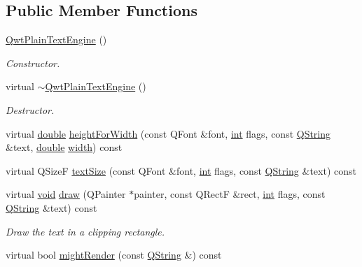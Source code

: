 \subsection*{Public Member Functions}
\begin{DoxyCompactItemize}
\item 
\hyperlink{class_qwt_plain_text_engine_a0ad29b2229a879afe49b546704eb7079}{Qwt\-Plain\-Text\-Engine} ()
\begin{DoxyCompactList}\small\item\em Constructor. \end{DoxyCompactList}\item 
virtual \hyperlink{class_qwt_plain_text_engine_a0ada8796b2caaff7bb8d61e9fb1b5143}{$\sim$\-Qwt\-Plain\-Text\-Engine} ()
\begin{DoxyCompactList}\small\item\em Destructor. \end{DoxyCompactList}\item 
virtual \hyperlink{_super_l_u_support_8h_a8956b2b9f49bf918deed98379d159ca7}{double} \hyperlink{class_qwt_plain_text_engine_a9190bdcb6ed447a5bc056ad8304ad58b}{height\-For\-Width} (const Q\-Font \&font, \hyperlink{ioapi_8h_a787fa3cf048117ba7123753c1e74fcd6}{int} flags, const \hyperlink{group___u_a_v_objects_plugin_gab9d252f49c333c94a72f97ce3105a32d}{Q\-String} \&text, \hyperlink{_super_l_u_support_8h_a8956b2b9f49bf918deed98379d159ca7}{double} \hyperlink{glext_8h_a76aaa5c50746272e7d2de9aece921757}{width}) const 
\item 
virtual Q\-Size\-F \hyperlink{class_qwt_plain_text_engine_a220628c0e315021a3ae9d4447bf88018}{text\-Size} (const Q\-Font \&font, \hyperlink{ioapi_8h_a787fa3cf048117ba7123753c1e74fcd6}{int} flags, const \hyperlink{group___u_a_v_objects_plugin_gab9d252f49c333c94a72f97ce3105a32d}{Q\-String} \&text) const 
\item 
virtual \hyperlink{group___u_a_v_objects_plugin_ga444cf2ff3f0ecbe028adce838d373f5c}{void} \hyperlink{class_qwt_plain_text_engine_a5fc2780c10ac2fb41aec91223b60fac7}{draw} (Q\-Painter $\ast$painter, const Q\-Rect\-F \&rect, \hyperlink{ioapi_8h_a787fa3cf048117ba7123753c1e74fcd6}{int} flags, const \hyperlink{group___u_a_v_objects_plugin_gab9d252f49c333c94a72f97ce3105a32d}{Q\-String} \&text) const 
\begin{DoxyCompactList}\small\item\em Draw the text in a clipping rectangle. \end{DoxyCompactList}\item 
virtual bool \hyperlink{class_qwt_plain_text_engine_ae7bd7417f0173e2d35fe1bf7a514ec9b}{might\-Render} (const \hyperlink{group___u_a_v_objects_plugin_gab9d252f49c333c94a72f97ce3105a32d}{Q\-String} \&) const 

\end{DoxyCompactItemize}

